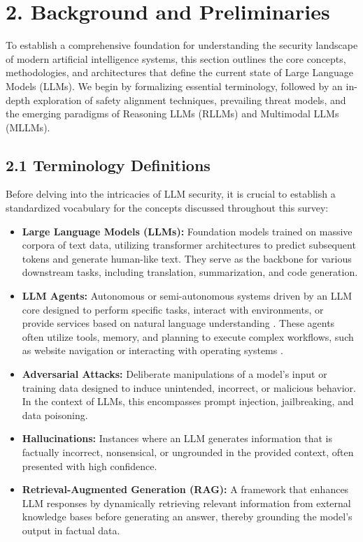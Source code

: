 \documentclass[11pt,a4paper]{article}
\begin{document}
\section{2. Background and Preliminaries}

To establish a comprehensive foundation for understanding the security landscape of modern artificial intelligence systems, this section outlines the core concepts, methodologies, and architectures that define the current state of Large Language Models (LLMs). We begin by formalizing essential terminology, followed by an in-depth exploration of safety alignment techniques, prevailing threat models, and the emerging paradigms of Reasoning LLMs (RLLMs) and Multimodal LLMs (MLLMs).

\subsection{2.1 Terminology Definitions}

Before delving into the intricacies of LLM security, it is crucial to establish a standardized vocabulary for the concepts discussed throughout this survey:

\begin{itemize}
 \item \textbf{Large Language Models (LLMs):} Foundation models trained on massive corpora of text data, utilizing transformer architectures to predict subsequent tokens and generate human-like text. They serve as the backbone for various downstream tasks, including translation, summarization, and code generation.
 \item \textbf{LLM Agents:} Autonomous or semi-autonomous systems driven by an LLM core designed to perform specific tasks, interact with environments, or provide services based on natural language understanding \cite{Wang_2024_LLM}. These agents often utilize tools, memory, and planning to execute complex workflows, such as website navigation or interacting with operating systems \cite{Wang_2024_LLM}.
 \item \textbf{Adversarial Attacks:} Deliberate manipulations of a model's input or training data designed to induce unintended, incorrect, or malicious behavior. In the context of LLMs, this encompasses prompt injection, jailbreaking, and data poisoning.
 \item \textbf{Hallucinations:} Instances where an LLM generates information that is factually incorrect, nonsensical, or ungrounded in the provided context, often presented with high confidence.
 \item \textbf{Retrieval-Augmented Generation (RAG):} A framework that enhances LLM responses by dynamically retrieving relevant information from external knowledge bases before generating an answer, thereby grounding the model's output in factual data.
\end{itemize}
\end{document}
